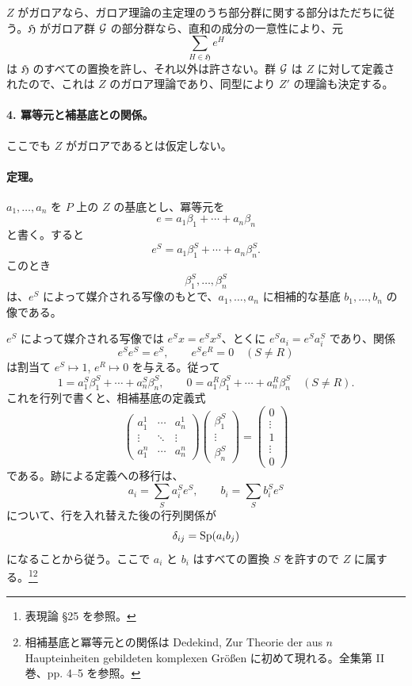 \(Z\) がガロアなら、ガロア理論の主定理のうち部分群に関する部分はただちに従う。\(\mathfrak H\) がガロア群 \(\mathcal G\) の部分群なら、直和の成分の一意性により、元
\[
        \sum_{H\in\mathfrak H} e^H
\]
は \(\mathfrak H\) のすべての置換を許し、それ以外は許さない。群 \(\mathcal G\) は \(Z\) に対して定義されたので、これは \(Z\) のガロア理論であり、同型により \(Z'\) の理論も決定する。

\paragraph{4. 冪等元と補基底との関係。}
ここでも \(Z\) がガロアであるとは仮定しない。

\paragraph{定理。}
\(a_1,\ldots,a_n\) を \(P\) 上の \(Z\) の基底とし、冪等元を
\[
        e=a_1\beta_1+\cdots+a_n\beta_n
\]
と書く。すると
\[
        e^S=a_1\beta_1^S+\cdots+a_n\beta_n^S .
\]
このとき
\[
        \beta_1^S,\ldots,\beta_n^S
\]
は、\(e^S\) によって媒介される写像のもとで、\(a_1,\ldots,a_n\) に相補的な基底 \(b_1,\ldots,b_n\) の像である。

\(e^S\) によって媒介される写像では \(e^Sx=e^Sx^S\)、とくに \(e^Sa_i=e^Sa_i^S\) であり、関係
\[
        e^Se^S=e^S,
        \qquad e^Se^R=0\quad(S\ne R)
\]
は割当て \(e^S\mapsto1\), \(e^R\mapsto0\) を与える。従って
\[
        1=a_1^S\beta_1^S+\cdots+a_n^S\beta_n^S,
        \qquad
        0=a_1^R\beta_1^S+\cdots+a_n^R\beta_n^S\quad(S\ne R).
\]
これを行列で書くと、相補基底の定義式
\[
\begin{pmatrix}
 a_1^1 & \cdots & a_n^1\\
 \vdots & \ddots & \vdots\\
 a_1^n & \cdots & a_n^n
\end{pmatrix}
\begin{pmatrix}
 \beta_1^S\\ \vdots\\ \beta_n^S
\end{pmatrix}
=
\begin{pmatrix}
0\\ \vdots\\ 1\\ \vdots\\ 0
\end{pmatrix}
\]
である。跡による定義への移行は、
\[
        a_i=\sum_S a_i^S e^S,
        \qquad b_i=\sum_S b_i^S e^S
\]
について、行を入れ替えた後の行列関係が
\[
        \delta_{ij}=\operatorname{Sp}(a_i b_j)
\]
になることから従う。ここで \(a_i\) と \(b_i\) はすべての置換 \(S\) を許すので \(Z\) に属する。\footnote{表現論 §25 を参照。}\footnote{相補基底と冪等元との関係は Dedekind, Zur Theorie der aus \(n\) Haupteinheiten gebildeten komplexen Größen に初めて現れる。全集第 II 巻、pp. 4--5 を参照。}

